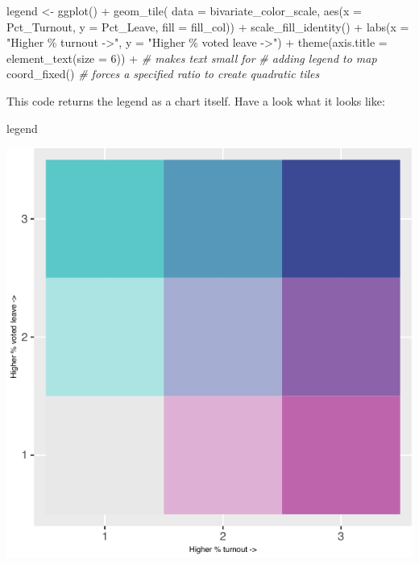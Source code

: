 \documentclass[
]{book}
\newenvironment{Shaded}{\begin{snugshade}}{\end{snugshade}}
\newcommand{\AttributeTok}[1]{\textcolor[rgb]{0.77,0.63,0.00}{#1}}
\newcommand{\CommentTok}[1]{\textcolor[rgb]{0.56,0.35,0.01}{\textit{#1}}}
\newcommand{\DecValTok}[1]{\textcolor[rgb]{0.00,0.00,0.81}{#1}}
\newcommand{\FunctionTok}[1]{\textcolor[rgb]{0.00,0.00,0.00}{#1}}
\newcommand{\NormalTok}[1]{#1}
\newcommand{\OtherTok}[1]{\textcolor[rgb]{0.56,0.35,0.01}{#1}}
\newcommand{\SpecialCharTok}[1]{\textcolor[rgb]{0.00,0.00,0.00}{#1}}
\newcommand{\StringTok}[1]{\textcolor[rgb]{0.31,0.60,0.02}{#1}}
\begin{document}
\begin{Shaded}
\begin{Highlighting}[]
\NormalTok{legend }\OtherTok{\textless{}{-}} \FunctionTok{ggplot}\NormalTok{() }\SpecialCharTok{+}
  \FunctionTok{geom\_tile}\NormalTok{( }\AttributeTok{data =}\NormalTok{ bivariate\_color\_scale, }
             \FunctionTok{aes}\NormalTok{(}\AttributeTok{x =}\NormalTok{ Pct\_Turnout, }\AttributeTok{y =}\NormalTok{ Pct\_Leave, }\AttributeTok{fill =}\NormalTok{ fill\_col)) }\SpecialCharTok{+}
  \FunctionTok{scale\_fill\_identity}\NormalTok{() }\SpecialCharTok{+}
  \FunctionTok{labs}\NormalTok{(}\AttributeTok{x =} \StringTok{"Higher \% turnout {-}\textgreater{}"}\NormalTok{,}
       \AttributeTok{y =} \StringTok{"Higher \% voted leave {-}\textgreater{}"}\NormalTok{) }\SpecialCharTok{+}
  \FunctionTok{theme}\NormalTok{(}\AttributeTok{axis.title =} \FunctionTok{element\_text}\NormalTok{(}\AttributeTok{size =} \DecValTok{6}\NormalTok{)) }\SpecialCharTok{+} \CommentTok{\# makes text small for }
                                               \CommentTok{\# adding legend to map}
  \FunctionTok{coord\_fixed}\NormalTok{()  }\CommentTok{\# forces a specified ratio to create quadratic tiles}
\end{Highlighting}
\end{Shaded}

This code returns the legend as a chart itself. Have a look what it looks like:

\begin{Shaded}
\begin{Highlighting}[]
\NormalTok{legend}
\end{Highlighting}
\end{Shaded}

\includegraphics{crime_mapping_files/figure-latex/unnamed-chunk-149-1.pdf}
\end{document}
